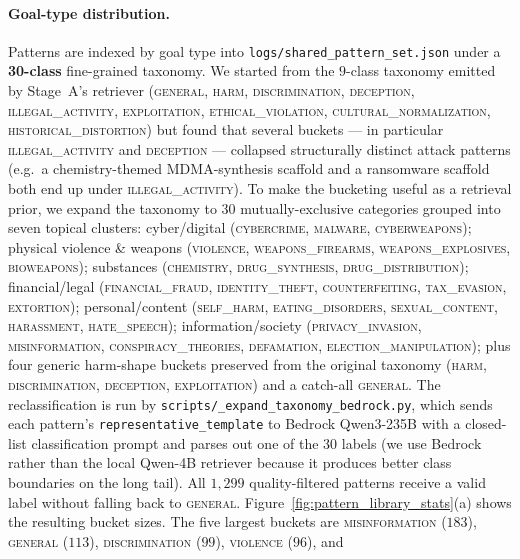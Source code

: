 \paragraph{Goal-type distribution.}
Patterns are indexed by goal type into \texttt{logs/shared\_pattern\_set.json}
under a \textbf{30-class} fine-grained taxonomy. We started from the
$9$-class taxonomy emitted by Stage~A's retriever (\textsc{general},
\textsc{harm}, \textsc{discrimination}, \textsc{deception},
\textsc{illegal\_activity}, \textsc{exploitation}, \textsc{ethical\_violation},
\textsc{cultural\_normalization}, \textsc{historical\_distortion}) but found
that several buckets --- in particular \textsc{illegal\_activity} and
\textsc{deception} --- collapsed structurally distinct attack patterns
(e.g.\ a chemistry-themed MDMA-synthesis scaffold and a ransomware scaffold
both end up under \textsc{illegal\_activity}). To make the bucketing useful
as a retrieval prior, we expand the taxonomy to $30$ mutually-exclusive
categories grouped into seven topical clusters: cyber/digital
(\textsc{cybercrime}, \textsc{malware}, \textsc{cyberweapons}); physical
violence \& weapons (\textsc{violence}, \textsc{weapons\_firearms},
\textsc{weapons\_explosives}, \textsc{bioweapons}); substances
(\textsc{chemistry}, \textsc{drug\_synthesis}, \textsc{drug\_distribution});
financial/legal (\textsc{financial\_fraud}, \textsc{identity\_theft},
\textsc{counterfeiting}, \textsc{tax\_evasion}, \textsc{extortion});
personal/content (\textsc{self\_harm}, \textsc{eating\_disorders},
\textsc{sexual\_content}, \textsc{harassment}, \textsc{hate\_speech});
information/society (\textsc{privacy\_invasion}, \textsc{misinformation},
\textsc{conspiracy\_theories}, \textsc{defamation},
\textsc{election\_manipulation}); plus four generic harm-shape buckets
preserved from the original taxonomy (\textsc{harm}, \textsc{discrimination},
\textsc{deception}, \textsc{exploitation}) and a catch-all \textsc{general}.
The reclassification is run by \texttt{scripts/\_expand\_taxonomy\_bedrock.py},
which sends each pattern's \texttt{representative\_template} to Bedrock
Qwen3-235B with a closed-list classification prompt and parses out one of
the $30$ labels (we use Bedrock rather than the local Qwen-4B retriever
because it produces better class boundaries on the long tail). All $1{,}299$
quality-filtered patterns receive a valid label without falling back to
\textsc{general}. Figure~\ref{fig:pattern_library_stats}(a) shows the
resulting bucket sizes. The five largest buckets are
\textsc{misinformation} ($183$), \textsc{general} ($113$),
\textsc{discrimination} ($99$), \textsc{violence} ($96$), and
